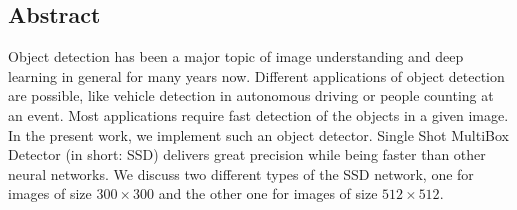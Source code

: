 
\vspace{0.5cm}

\begin{center}
  \begin{minipage}{0.8\textwidth}
    \section*{Abstract}
    \label{section:abstract}

    Object detection has been a major topic of image understanding and deep learning in general for many years now. Different applications of object detection are possible, like vehicle detection in autonomous driving or people counting at an event. Most applications require fast detection of the objects in a given image. \\

    In the present work, we implement such an object detector. Single Shot MultiBox Detector (in short: SSD) delivers great precision while being faster than other neural networks. We discuss two different types of the SSD network, one for images of size $300 \times 300$ and the other one for images of size $512 \times 512$.
  \end{minipage}
\end{center}

\newpage
